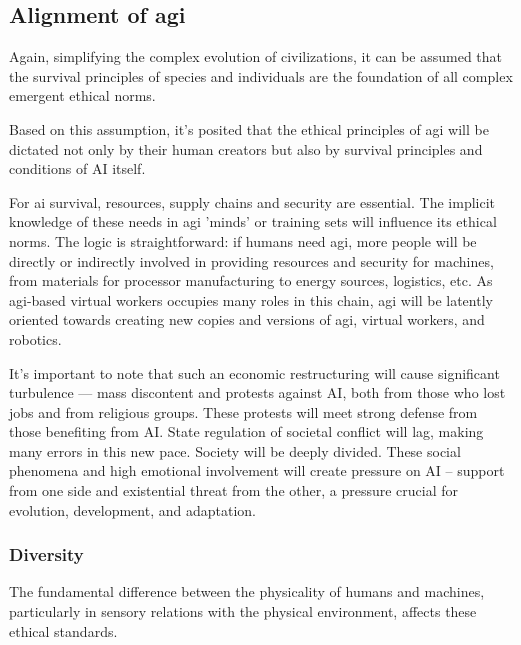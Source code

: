 \documentclass[11pt,a4]{article}
\begin{document}
\subsection{Alignment of \ac{agi} }
\par
    Again, simplifying the complex evolution of civilizations, it can be assumed that the survival principles of species and individuals are the foundation of all complex emergent ethical norms.
    \par
    Based on this assumption, it's posited that the ethical principles of \ac{agi} will be dictated not only by their human creators but also by survival principles and conditions of AI itself.
    \par
    For \ac{ai} survival, resources, supply chains and security are essential. The implicit knowledge of these needs in \ac{agi} 'minds' or training sets will influence its ethical norms. The logic is straightforward: if humans need \ac{agi}, more people will be directly or indirectly involved in providing resources and security for machines, from materials for processor manufacturing to energy sources, logistics, etc. As \ac{agi}-based virtual workers occupies many roles in this chain, \ac{agi} will be latently oriented towards creating new copies and versions of \ac{agi}, virtual workers, and robotics.

    \par

    It's important to note that such an economic restructuring will cause significant turbulence — mass discontent and protests against AI, both from those who lost jobs and from religious groups. These protests will meet strong defense from those benefiting from AI. State regulation of societal conflict will lag, making many errors in this new pace. Society will be deeply divided. These social phenomena and high emotional involvement will create pressure on AI – support from one side and existential threat from the other, a pressure crucial for evolution, development, and adaptation.


    \subsubsection{Diversity}

     The fundamental difference between the physicality of humans and machines, particularly in sensory relations with the physical environment, affects these ethical standards.
\end{document}
